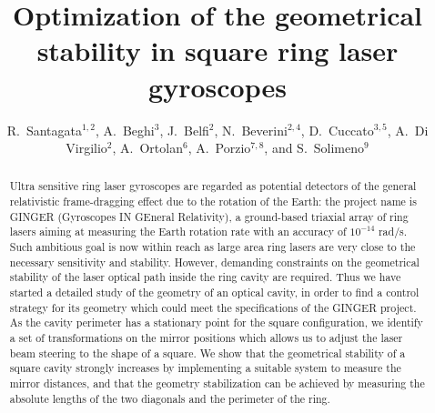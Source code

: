 \documentclass[12pt,a4paper,final]{iopart}
\begin{document}
\title{Optimization of the geometrical stability in square ring laser gyroscopes}
\author{R.~Santagata$^{1,2}$, A.~Beghi$^{3}$, J.~Belfi$^{2}$, N.~Beverini$^{2,4}$, D.~Cuccato$^{3,5}$, A.~Di Virgilio$^2$, A.~Ortolan$^{6}$, A.~Porzio$^{7,8}$, and S.~Solimeno$^{9}$}

\address{$^1$Department of Physics, University of Siena, Via Roma 56, Siena, Italy}
\address{$^2$INFN Section of Pisa, Largo Bruno Pontecorvo 3, Pisa, Italy}
\address{$^3$Department of Information Engineering, University of Padova, Via Gradenigo 6/B, Padova, Italy}
\address{$^4$Department of Physics, University of Pisa, Largo Bruno Pontecorvo 3, Pisa, Italy}
\address{$^5$INFN Sezione di Padova, Via Marzolo 8, 35131, Padova, Italy}
\address{$^6$INFN National Laboratories of Legnaro, Viale dell'Universit\`a 2, Legnaro, Padova, Italy}
\address{$^7$CNR-SPIN Section of Napoli, Complesso Universitario Monte Sant'Angelo, Via Cintia, Napoli, Italy}
\address{$^8$INFN Section of Napoli, Complesso Universitario Monte Sant'Angelo, Via Cintia, Napoli, Italy}
\address{$^9$Department of Physics, University of Napoli, Complesso Universitario Monte Sant'Angelo, Via Cintia, Napoli, Italy}

\begin{abstract}
Ultra sensitive ring laser gyroscopes are regarded  as potential detectors of the general relativistic frame-dragging effect due 
to the rotation of the Earth: the project name is GINGER (Gyroscopes IN GEneral Relativity), 
a ground-based triaxial array of ring lasers aiming at measuring the Earth rotation rate with an accuracy of $10^{-14}$ rad/s. Such ambitious goal is now within reach as large area ring lasers are very close to the necessary sensitivity and stability.  However, demanding constraints on the geometrical stability of the laser optical path inside the ring cavity are required. Thus we have started a detailed study of the geometry of an optical cavity, in order to find a control strategy for its geometry which could meet the specifications of the GINGER project. As the cavity perimeter has a stationary point for the square configuration, we identify a set of transformations on the mirror positions which allows us to adjust the laser beam steering to the shape of a square.  We show that the geometrical stability of a square cavity strongly increases by implementing a suitable system to measure the mirror distances, and that the geometry stabilization can be achieved by measuring the absolute lengths of the two diagonals and the perimeter of the ring. 

\end{abstract}
\end{document}
